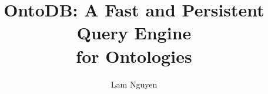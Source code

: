 \documentclass[sigconf, nonacm]{acmart}
\newif\iffull
\begin{document}
\iffull
\title{OntoDB: A Fast and Persistent Query Engine\\for Ontologies (Extended Version)}
\else
\title{OntoDB: A Fast and Persistent Query Engine\\for Ontologies}
\fi

\author{Lam Nguyen}




\maketitle

\vldbtopmatter

\iffull












\else











\fi




\clearpage
\appendix

\end{document}
